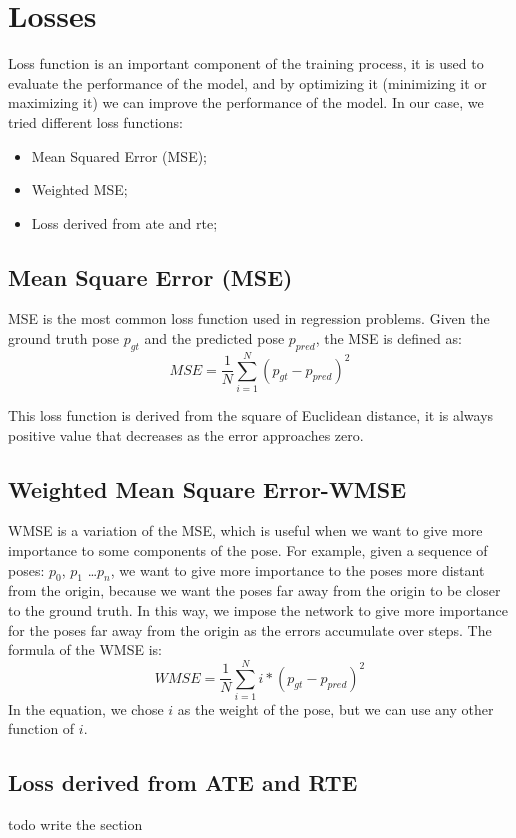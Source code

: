 \section{Losses}\label{sec:losses}
Loss function is an important component of the training process, it is used to evaluate the performance of the model, and by optimizing it (minimizing it or maximizing it) we can improve the performance of the model.
In our case, we tried different loss functions:
\begin{itemize}
    \item Mean Squared Error (MSE);
    \item Weighted MSE;
    \item Loss derived from \gls{ate} and \gls{rte};
\end{itemize}

\subsection{Mean Square Error (MSE)}\label{subsec:mean-square-error-(mse)}
MSE is the most common loss function used in regression problems.
Given the ground truth pose $p_{gt}$ and the predicted pose $p_{pred}$, the MSE is defined as:
\begin{equation}
    \label{eq:mean-square-error}
    MSE = \frac{1}{N} \sum_{i=1}^{N} (p_{gt} - p_{pred})^2
\end{equation}

This loss function is derived from the square of Euclidean distance, it is always positive value that decreases as the error approaches zero.

\subsection{Weighted Mean Square Error-WMSE}\label{subsec:weighted-mean-square-error-wmse}
WMSE is a variation of the MSE, which is useful when we want to give more importance to some components of the pose.
For example, given a sequence of poses: $p_0$, $p_1$ \dots $p_n$, we want to give more importance to the poses more distant from the origin, because we want the poses far away from the origin to be closer to the ground truth.
In this way, we impose the network to give more importance for the poses far away from the origin as the errors accumulate over steps.
The formula of the WMSE is:
\begin{equation}
    \label{eq:weighted-mean-square-error}
    WMSE = \frac{1}{N} \sum_{i=1}^{N} i * (p_{gt} - p_{pred})^2
\end{equation}
In the equation, we chose $i$ as the weight of the pose, but we can use any other function of $i$.

\subsection[ATE and RPE loss]{Loss derived from ATE and RTE}\label{subsec:loss-derived-from-ate-and-rte}

todo write the section
